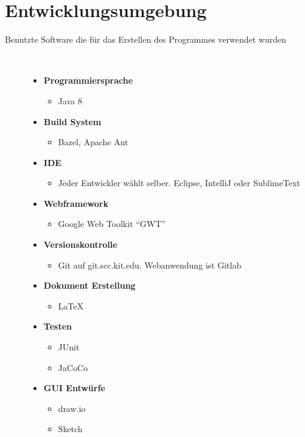 \documentclass[parskip=full,11pt,twoside]{scrartcl}
\begin{document}
\newpage
\section{Entwicklungsumgebung}
  \begin{description}
	\item[Benutzte Software die für das Erstellen des Programmes verwendet wurden]~\par
	\begin{itemize}
		\item \textbf{Programmiersprache}
		\begin{itemize}
			\item Java 8
		\end{itemize}
		\item \textbf{Build System}
		\begin{itemize}
			\item Bazel, Apache Ant
		\end{itemize}
		\item \textbf{IDE}
		\begin{itemize}
			\item Jeder Entwickler wählt selber. Eclipse, IntelliJ oder SublimeText
		\end{itemize}
		\item \textbf{Webframework}
		\begin{itemize}
			\item Google Web Toolkit \enquote{GWT}
		\end{itemize}
		\item \textbf{Versionskontrolle}
		\begin{itemize}
			\item Git auf git.scc.kit.edu. Webanwendung ist Gitlab
		\end{itemize}
		\item \textbf{Dokument Erstellung}
		\begin{itemize}
			\item LaTeX
		\end{itemize}
		\item \textbf{Testen}
		\begin{itemize}
			\item JUnit
			\item JaCoCo
		\end{itemize}
		\item \textbf{GUI Entwürfe}
			\begin{itemize}
				\item draw.io
				\item Sketch

\end{itemize}
\end{itemize}
\end{description}
\end{document}
